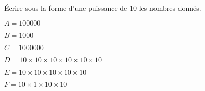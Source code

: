 
Écrire sous la forme d'une puissance de 10 les nombres donnés.

\begin{enumerate}
\begin{minipage}{0.39\linewidth}
\item $A=100000$
\item $B=1000$
\item $C=1000000$ 
\end{minipage}
\hfill
\begin{minipage}{0.59\linewidth}
\item $D=10 \times 10 \times 10 \times 10 \times 10 \times 10$
\item $E=10 \times 10 \times 10 \times 10 \times 10$ 
\item $F=10 \times 1 \times 10 \times 10$ 
\end{minipage}
\end{enumerate}